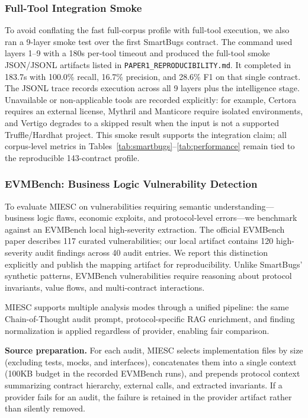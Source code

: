 \documentclass[conference]{IEEEtran}
\begin{document}
\subsubsection{Full-Tool Integration Smoke}

To avoid conflating the fast full-corpus profile with full-tool execution, we also ran a 9-layer smoke test over the first SmartBugs contract. The command used layers 1--9 with a 180s per-tool timeout and produced the full-tool smoke JSON/JSONL artifacts listed in \texttt{PAPER1\_REPRODUCIBILITY.md}. It completed in 183.7s with 100.0\% recall, 16.7\% precision, and 28.6\% F1 on that single contract. The JSONL trace records execution across all 9 layers plus the intelligence stage. Unavailable or non-applicable tools are recorded explicitly: for example, Certora requires an external license, Mythril and Manticore require isolated environments, and Vertigo degrades to a skipped result when the input is not a supported Truffle/Hardhat project. This smoke result supports the integration claim; all corpus-level metrics in Tables~\ref{tab:smartbugs}--\ref{tab:performance} remain tied to the reproducible 143-contract profile.

\subsubsection{EVMBench: Business Logic Vulnerability Detection}
\label{sec:evmbench}

To evaluate MIESC on vulnerabilities requiring semantic understanding---business logic flaws, economic exploits, and protocol-level errors---we benchmark against an EVMBench local high-severity extraction. The official EVMBench paper describes 117 curated vulnerabilities; our local artifact contains 120 high-severity audit findings across 40 audit entries. We report this distinction explicitly and publish the mapping artifact for reproducibility. Unlike SmartBugs' synthetic patterns, EVMBench vulnerabilities require reasoning about protocol invariants, value flows, and multi-contract interactions.

MIESC supports multiple analysis modes through a unified pipeline: the same Chain-of-Thought audit prompt, protocol-specific RAG enrichment, and finding normalization is applied regardless of provider, enabling fair comparison.

\textbf{Source preparation.} For each audit, MIESC selects implementation files by size (excluding tests, mocks, and interfaces), concatenates them into a single context (100KB budget in the recorded EVMBench runs), and prepends protocol context summarizing contract hierarchy, external calls, and extracted invariants. If a provider fails for an audit, the failure is retained in the provider artifact rather than silently removed.
\end{document}
